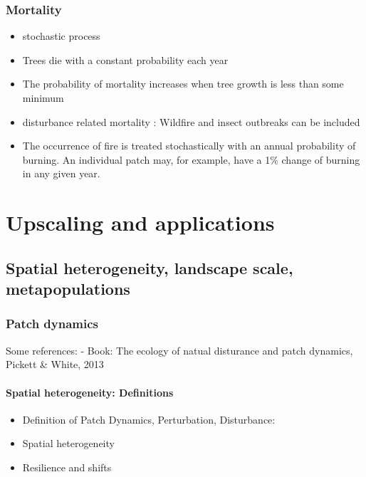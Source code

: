 \documentclass[12pt,oneside]{book}
\providecommand{\tightlist}{%
  \setlength{\itemsep}{0pt}\setlength{\parskip}{0pt}}
\begin{document}
\section{Mortality}\label{mortality}

\begin{itemize}
\item
  stochastic process
\item
  Trees die with a constant probability each year
\item
  The probability of mortality increases when tree growth is less than
  some minimum
\item
  disturbance related mortality : Wildfire and insect outbreaks can be
  included
\item
  The occurrence of fire is treated stochastically with an annual
  probability of burning. An individual patch may, for example, have a
  1\% change of burning in any given year.
\end{itemize}

\part{Upscaling and
applications}\label{part-upscaling-and-applications}

\chapter{Spatial heterogeneity, landscape scale,
metapopulations}\label{spatial-heterogeneity-landscape-scale-metapopulations}


\section{Patch dynamics}\label{patch-dynamics}

Some references: - Book: The ecology of natual disturance and patch
dynamics, Pickett \& White, 2013

\subsection{Spatial heterogeneity:
Definitions}\label{spatial-heterogeneity-definitions}

\begin{itemize}
\tightlist
\item
  Definition of Patch Dynamics, Perturbation, Disturbance:
\item
  Spatial heterogeneity
\item
  Resilience and shifts
\end{itemize}
\end{document}
